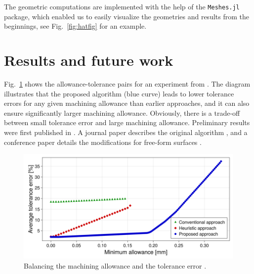 \documentclass{juliacon}
\begin{document}
The geometric computations are implemented with the help of the \texttt{Meshes.jl} package, which enabled us to easily visualize the geometries and results from the beginnings, see Fig.~\ref{fig:hatfig} for an example.

\section{Results and future work} %
\label{sec:results}

Fig.~\ref{fig:pareto} shows the allowance-tolerance pairs for an experiment from \cite{cserteg:2023_Annals}.
The diagram illustrates that the proposed algorithm (blue curve) leads to lower tolerance errors for any given machining allowance than earlier approaches, and it can also ensure significantly larger machining allowance.
Obviously, there is a trade-off between small tolerance error and large machining allowance.
Preliminary results were first published in \cite{cserteg:2023_DigitalTwinAssisted}.
A journal paper describes the original algorithm \cite{cserteg:2023_Annals}, and a conference paper details the modifications for free-form surfaces \cite{cserteg:2023_CMS}.

\begin{figure}[t]
	\centerline{\includegraphics[width=0.95\columnwidth]{pareto-new-label.png}}
	\caption{Balancing the machining allowance and the tolerance error \cite{cserteg:2023_Annals}.}
	\label{fig:pareto}
\end{figure}
\end{document}
